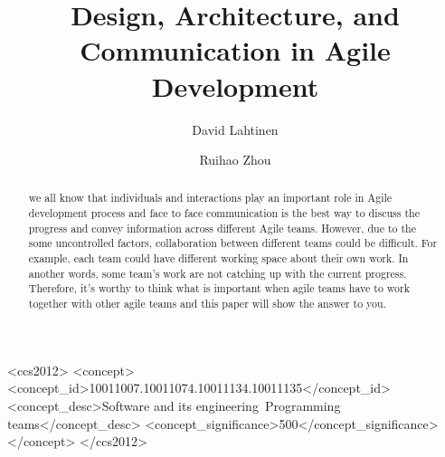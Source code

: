 \documentclass[sigplan,screen]{acmart}
\begin{document}
%
\title{Design, Architecture, and Communication in Agile Development}

%
\author{David Lahtinen}
\author{Ruihao Zhou}
\authornotemark[1]

%
\renewcommand{\shortauthors}{Trovato and Tobin, et al.}

%
\begin{abstract}
we all know that individuals and interactions play an important role in Agile development process and face to face communication is the best way to discuss the progress and convey information across different Agile teams. However, due to the some uncontrolled factors, collaboration between different teams could be difficult. For example, each team could have different working space about their own work. In another words, some team’s work are not catching up with the current progress. Therefore, it’s worthy to think what is important when agile teams have to work together with other agile teams and this paper will show the answer to you.
\end{abstract}

%
%
\begin{CCSXML}
<ccs2012>
  <concept>
    <concept_id>10011007.10011074.10011134.10011135</concept_id>
    <concept_desc>Software and its engineering~Programming teams</concept_desc>
    <concept_significance>500</concept_significance>
  </concept>
</ccs2012>
\end{CCSXML}

\end{document}

